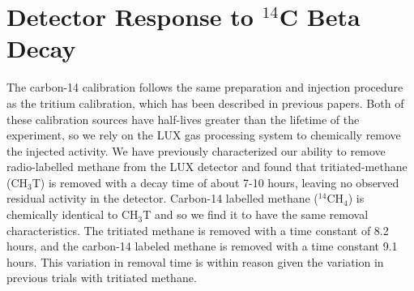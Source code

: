 \chapter{Detector Response to $^{14}$C Beta Decay}

The carbon-14 calibration follows the same preparation and injection procedure as the tritium calibration, which has been described in previous papers.\cite{lux_tritium,richard,attila} Both of these calibration sources have half-lives greater than the lifetime of the experiment, so we rely on the LUX gas processing system to chemically remove the injected activity. We have previously characterized our ability to remove radio-labelled methane from the LUX detector and found that tritiated-methane (CH$_3$T) is removed with a decay time of about 7-10 hours, leaving no observed residual activity in the detector. Carbon-14 labelled methane ($^{14}$CH$_4$) is chemically identical to CH$_3$T and so we find it to have the same removal characteristics. The tritiated methane is removed with a time constant of 8.2 hours, and the carbon-14 labeled methane is removed with a time constant 9.1 hours. This variation in removal time is within reason given the variation in previous trials with tritiated methane.
